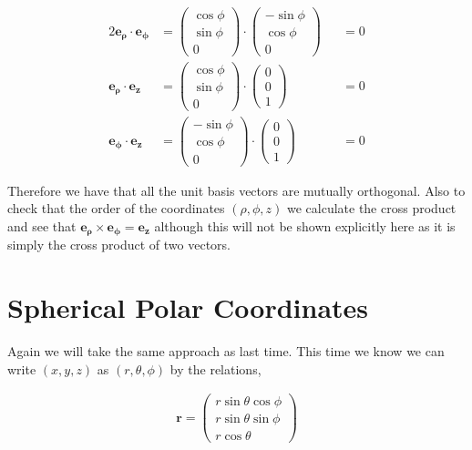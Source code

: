 \documentclass[11pt]{amsart}
\begin{document}
\begin{alignat*}{2}
  \mathbf{e_{\rho}}\cdot\mathbf{e_{\phi}}&=
  \begin{pmatrix}
    \cos\phi \\
    \sin\phi \\
    0
  \end{pmatrix}\cdot
  \begin{pmatrix}
    -\sin\phi \\
    \cos\phi \\
    0
  \end{pmatrix} &&= 0 \\
  \mathbf{e_{\rho}}\cdot\mathbf{e_z}&=
  \begin{pmatrix}
    \cos\phi \\
    \sin\phi \\
    0
  \end{pmatrix}\cdot
  \begin{pmatrix}
    0 \\
    0 \\
    1
  \end{pmatrix} &&= 0 \\
  \mathbf{e_{\phi}}\cdot\mathbf{e_z}&=
  \begin{pmatrix}
    -\sin\phi \\
    \cos\phi \\
    0
  \end{pmatrix}\cdot
  \begin{pmatrix}
    0 \\
    0 \\
    1
  \end{pmatrix} &&= 0
\end{alignat*}

Therefore we have that all the unit basis vectors are mutually orthogonal. Also to check that the order of the coordinates $(\rho, \phi, z)$ we calculate the cross product and see that $\mathbf{e_{\rho}}\times\mathbf{e_{\phi}}=\mathbf{e_z}$ although this will not be shown explicitly here as it is simply the cross product of two vectors.

\section{Spherical Polar Coordinates}

Again we will take the same approach as last time. This time we know we can write $(x, y, z)$ as $(r, \theta, \phi)$ by the relations,

\begin{align*}
  \mathbf{r} =
  \begin{pmatrix}
    r\sin\theta\cos\phi \\
    r\sin\theta\sin\phi \\
    r\cos\theta
  \end{pmatrix}
\end{align*}
\end{document}
